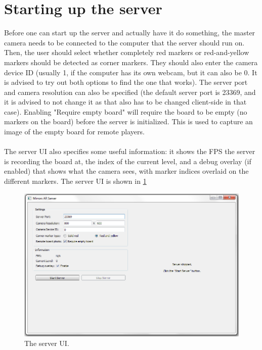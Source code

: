 \documentclass[]{report}
\begin{document}
\section*{Starting up the server}
Before one can start up the server and actually have it do something, the master
camera needs to be connected to the computer that the server should run on. 
Then, the user should select whether completely red markers or red-and-yellow
markers should be detected as corner markers. They should also enter the camera
device ID (usually 1, if the computer has its own webcam, but it can also be 0.
It is advised to try out both options to find the one that works). The server
port and camera resolution can also be specified (the default server port is 
23369, and it is advised to not change it as that also has to be changed
client-side in that case). Enabling "Require empty board" will require the board
to be empty (no markers on the board) before the server is initialized. This is
used to capture an image of the empty board for remote players. \\
\\
The server UI also specifies some useful information: it shows the FPS the
server is recording the board at, the index of the current level, and a debug
overlay (if enabled) that shows what the camera sees, with marker indices
overlaid on the different markers. The server UI is shown in \ref{fig:serverui}
\begin{figure}[!ht]
    \centering
    \includegraphics[scale = 0.5]{MirrorServerUI}
    \caption{The server UI.}
    \label{fig:serverui}
\end{figure}
\end{document}
